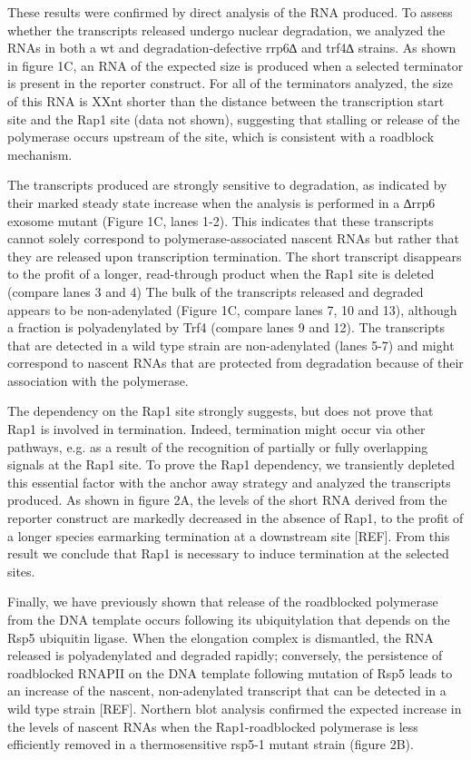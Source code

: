 These results were confirmed by direct analysis of the RNA produced. To assess whether the transcripts released undergo nuclear degradation, we analyzed the RNAs in both a wt and degradation-defective rrp6∆ and trf4∆ strains. As shown in figure 1C, an RNA of the expected size is produced when a selected terminator is present in the reporter construct. For all of the terminators analyzed, the size of this RNA is XXnt shorter than the distance between the transcription start site and the Rap1 site (data not shown), suggesting that stalling or release of the polymerase occurs upstream of the site, which is consistent with a roadblock mechanism. 

The transcripts produced are strongly sensitive to degradation, as indicated by their marked steady state increase when the analysis is performed in a ∆rrp6 exosome mutant (Figure 1C, lanes 1-2). This indicates that these transcripts cannot solely correspond to polymerase-associated nascent RNAs but rather that they are released upon transcription termination. The short transcript disappears to the profit of a longer, read-through product when the Rap1 site is deleted (compare lanes 3 and 4) The bulk of the transcripts released and degraded appears to be non-adenylated (Figure 1C, compare lanes 7, 10 and 13), although a fraction is polyadenylated by Trf4 (compare lanes 9 and 12). The transcripts that are detected in a wild type strain are non-adenylated (lanes 5-7) and might correspond to nascent RNAs that are protected from degradation because of their association with the polymerase.

The dependency on the Rap1 site strongly suggests, but does not prove that Rap1 is involved in termination. Indeed, termination might occur via other pathways, e.g. as a result of the recognition of partially or fully overlapping signals at the Rap1 site.  To prove the Rap1 dependency, we transiently depleted this essential factor with the anchor away strategy and analyzed the transcripts produced. As shown in figure 2A, the levels of the short RNA derived from the reporter construct are markedly decreased in the absence of Rap1, to the profit of a longer species earmarking termination at a downstream site [REF]. From this result we conclude that Rap1 is necessary to induce termination at the selected sites. 

Finally, we have previously shown that release of the roadblocked polymerase from the DNA template occurs following its ubiquitylation that depends on the Rsp5 ubiquitin ligase. When the elongation complex is dismantled, the RNA released is polyadenylated and degraded rapidly; conversely, the persistence of roadblocked RNAPII on the DNA template following mutation of Rsp5 leads to an increase of the nascent, non-adenylated transcript that can be detected in a wild type strain [REF]. Northern blot analysis confirmed the expected increase in the levels of nascent RNAs when the Rap1-roadblocked polymerase is less efficiently removed in a thermosensitive rsp5-1 mutant strain (figure 2B). 

